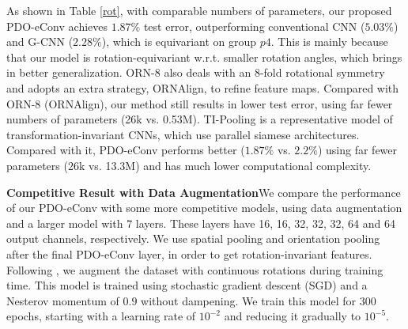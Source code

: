 \documentclass{article}
\begin{document}
As shown in Table \ref{rot}, with comparable numbers of parameters, our proposed PDO-eConv achieves $1.87\%$ test error, outperforming conventional CNN ($5.03\%$) and G-CNN ($2.28\%$), which is equivariant on group $p4$. This is mainly because that our model is rotation-equivariant w.r.t. smaller rotation angles, which brings in better generalization. ORN-$8$ also deals with an $8$-fold rotational symmetry and adopts an extra strategy, ORNAlign, to refine feature maps. Compared with ORN-8 (ORNAlign), our method still results in lower test error, using far fewer numbers of parameters (26k vs. 0.53M). TI-Pooling is a representative model of transformation-invariant CNNs, which use parallel siamese architectures. Compared with it, PDO-eConv performs better ($1.87\%$ vs. $2.2\%$) using far fewer parameters (26k vs. 13.3M) and has much lower computational complexity.

\begin{table}[b]
	\caption{Competitive results on MNIST-rot-12k.}\smallskip
	\centering
	\linespread{1.2}\selectfont
	\label{sota}
\end{table}

\textbf{Competitive Result with Data Augmentation}\quad We compare the performance of our PDO-eConv with some more competitive models, using data augmentation and a larger model with $7$ layers. These layers have 16, 16, 32, 32, 32, 64 and 64 output channels, respectively. We use spatial pooling and orientation pooling after the final PDO-eConv layer, in order to get rotation-invariant features. Following \cite{weiler2018learning}, we augment the dataset with continuous rotations during training time. This model is trained using stochastic gradient descent (SGD) and a Nesterov momentum \cite{sutskever2013importance} of $0.9$ without dampening. We train this model for $300$ epochs, starting with a learning rate of $10^{-2}$ and reducing it gradually to $10^{-5}$.
\end{document}
